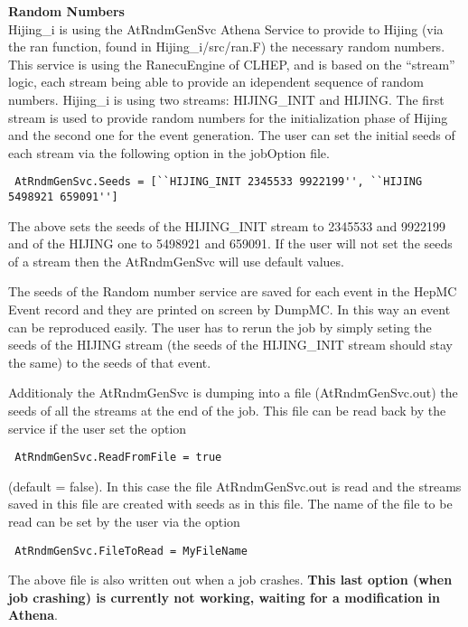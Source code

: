 \documentclass[11pt]{article}
\begin{document}
{\large \bf Random Numbers}\\

 Hijing\_i is using the AtRndmGenSvc Athena Service to provide to Hijing (via the ran function,
 found in Hijing\_i/src/ran.F) the necessary random numbers. This service is using the RanecuEngine of CLHEP,
 and is based on the ``stream'' logic, each stream being able to provide an idependent sequence of random
 numbers. Hijing\_i is using two streams: HIJING\_INIT and HIJING. The first stream is used to provide
 random numbers for the initialization phase of Hijing and the second one for the event generation. The user
 can set the initial seeds of each stream via the following option in the jobOption file.

 \begin{verbatim} 
 AtRndmGenSvc.Seeds = [``HIJING_INIT 2345533 9922199'', ``HIJING 5498921 659091'']
 \end{verbatim}

 The above sets the seeds of the HIJING\_INIT stream to 2345533 and 9922199 and of the HIJING one to
 5498921 and 659091. If the user will not set the seeds of a stream then the AtRndmGenSvc will use default
 values.

 The seeds of the Random number service are saved for each event in the HepMC Event record and they are printed
 on screen by DumpMC. In this way an event can be reproduced easily. The user has to rerun the job by simply seting
 the seeds of the HIJING stream (the seeds of the HIJING\_INIT stream should stay the same) to the seeds of that
 event.

 Additionaly the AtRndmGenSvc is dumping into a file (AtRndmGenSvc.out) the seeds of all the streams at the end
 of the job. This file can be read back by the service if the user set the option
 \begin{verbatim} AtRndmGenSvc.ReadFromFile = true \end{verbatim} (default = false). In this case the file
 AtRndmGenSvc.out is read and the streams saved in this file are created with seeds as in this file. The name of
 the file to be read can be set by the user via the option
 \begin{verbatim} AtRndmGenSvc.FileToRead = MyFileName \end{verbatim}

 The above file is also written out when a job crashes. {\bf This last option (when job crashing) is currently not
   working, waiting for a modification in Athena}.
\end{document}
